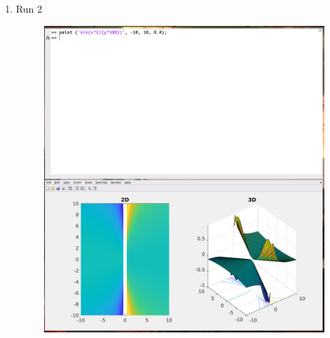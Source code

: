 \documentclass[12pt,a4paper]{article}
\begin{document}
\begin{enumerate}[leftmargin=!,labelindent=5pt]
	\item Run 2
		\begin{figure}[H]
			\centering
			\includegraphics[scale=0.2]{./img/paint_02.png}\label{fig:1}
		\end{figure}
\end{enumerate}
\end{document}
